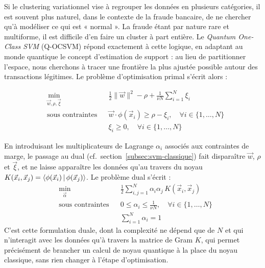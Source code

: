 \documentclass[a4paper]{article}
\begin{document}
Si le clustering variationnel vise à regrouper les données en plusieurs catégories, il est souvent plus naturel, dans le contexte de la fraude bancaire, de ne chercher qu'à modéliser ce qui est « normal ». La fraude étant par nature rare et multiforme, il est difficile d'en faire un cluster à part entière. Le \emph{Quantum One-Class SVM} (Q-OCSVM) répond exactement à cette logique, en adaptant au monde quantique le concept d'estimation de support \cite{scholkopf2001ocsvm} : au lieu de partitionner l'espace, nous cherchons à tracer une frontière la plus ajustée possible autour des transactions légitimes. Le problème d'optimisation primal s'écrit alors :

\begin{equation}
\begin{aligned}
    & \min_{\vec{w}, \rho, \vec{\xi}}
    & & \frac{1}{2} \|\vec{w}\|^2 - \rho + \frac{1}{\nu N} \sum_{i=1}^{N} \xi_i \\
    & \text{sous contraintes}
    & & \vec{w} \cdot \phi(\vec{x}_i) \geq \rho - \xi_i, \quad \forall i \in \{1, \dots, N\} \\
    & & & \xi_i \geq 0, \quad \forall i \in \{1, \dots, N\}
\end{aligned}
\label{eq:ocsvm_primal}
\end{equation}

En introduisant les multiplicateurs de Lagrange $\alpha_i$ associés aux contraintes de marge, le passage au dual (cf.~section~\ref{subsec:svm-classique}) fait disparaître $\vec{w}$, $\rho$ et $\vec{\xi}$, et ne laisse apparaître les données qu'au travers du noyau $K(\vec{x}_i, \vec{x}_j) = \braket{\phi(\vec{x}_i)\,|\,\phi(\vec{x}_j)}$. Le problème dual s'écrit :
\begin{equation}
\begin{aligned}
    & \min_{\vec{\alpha}}
    & & \frac{1}{2} \sum_{i,j=1}^{N} \alpha_i \alpha_j\, K(\vec{x}_i, \vec{x}_j) \\
    & \text{sous contraintes}
    & & 0 \leq \alpha_i \leq \frac{1}{\nu N}, \quad \forall i \in \{1, \dots, N\} \\
    & & & \sum_{i=1}^{N} \alpha_i = 1
\end{aligned}
\label{eq:ocsvm_dual}
\end{equation}
C'est cette formulation duale, dont la complexité ne dépend que de $N$ et qui n'interagit avec les données qu'à travers la matrice de Gram $K$, qui permet précisément de brancher un calcul de noyau quantique à la place du noyau classique, sans rien changer à l'étape d'optimisation.
\end{document}
